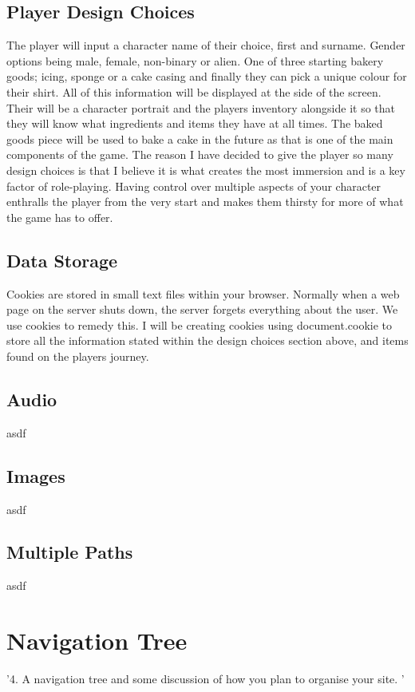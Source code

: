 \documentclass[10pt, a4paper]{article}
\begin{document}
    \subsection{Player Design Choices}
    The player will input a character name of their choice, first and surname. Gender options being male, female, non-binary or alien. One of three starting bakery goods; icing, sponge or a cake casing and finally they can pick a unique colour for their shirt. All of this information will be displayed at the side of the screen. Their will be a character portrait and the players inventory alongside it so that they will know what ingredients and items they have at all times. The baked goods piece will be used to bake a cake in the future as that is one of the main components of the game. The reason I have decided to give the player so many design choices is that I believe it is what creates the most immersion and is a key factor of role-playing. Having control over multiple aspects of your character enthralls the player from the very start and makes them thirsty for more of what the game has to offer.
    
    \subsection{Data Storage}
    Cookies are stored in small text files within your browser. Normally when a web page on the server shuts down, the server forgets everything about the user. We use cookies to remedy this. I will be creating cookies using document.cookie to store all the information stated within the design choices section above, and items found on the players journey.
    
    \subsection{Audio}
    asdf
    
    \subsection{Images}
    asdf
    
    \subsection{Multiple Paths}
    asdf
    
    \section{Navigation Tree}
    '4. A navigation tree and some discussion of how you plan to organise your site. '
\end{document}
